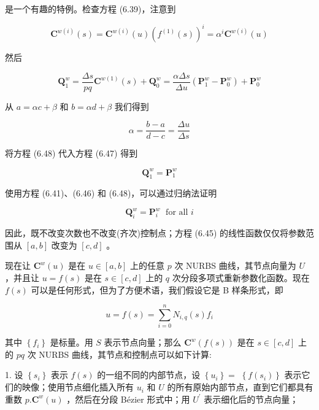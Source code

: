 \documentclass[../main.tex]{subfiles}
\begin{document}
是一个有趣的特例。检查方程 (6.39)，注意到

\[
{\mathbf{C}}^{w\left( i\right) }\left( s\right)  = {\mathbf{C}}^{w\left( i\right) }\left( u\right) {\left( {f}^{\left( 1\right) }\left( s\right) \right) }^{i} = {\alpha }^{i}{\mathbf{C}}^{w\left( i\right) }\left( u\right)  \tag{6.46}
\]

然后

\[
{\mathbf{Q}}_{1}^{w} = \frac{\Delta s}{pq}{\mathbf{C}}^{w\left( 1\right) }\left( s\right)  + {\mathbf{Q}}_{0}^{w} = \frac{\alpha \Delta s}{\Delta u}\left( {{\mathbf{P}}_{1}^{w} - {\mathbf{P}}_{0}^{w}}\right)  + {\mathbf{P}}_{0}^{w} \tag{6.47}
\]

从 \(a = {\alpha c} + \beta\) 和 \(b = {\alpha d} + \beta\) 我们得到

\[
\alpha  = \frac{b - a}{d - c} = \frac{\Delta u}{\Delta s} \tag{6.48}
\]

将方程 (6.48) 代入方程 (6.47) 得到

\[
{\mathbf{Q}}_{1}^{w} = {\mathbf{P}}_{1}^{w}
\]

使用方程 (6.41)、(6.46) 和 (6.48)，可以通过归纳法证明

\[
{\mathbf{Q}}_{i}^{w} = {\mathbf{P}}_{i}^{w}\;\text{ for all }i \tag{6.49}
\]

因此，既不改变次数也不改变(齐次)控制点；方程 (6.45) 的线性函数仅仅将参数范围从 \(\left\lbrack  {a,b}\right\rbrack\) 改变为 \(\left\lbrack  {c,d}\right\rbrack\) 。

现在让 \({\mathbf{C}}^{w}\left( u\right)\) 是在 \(u \in  \left\lbrack  {a,b}\right\rbrack\) 上的任意 \(p\) 次 NURBS 曲线，其节点向量为 \(U\) ，并且让 \(u = f\left( s\right)\) 是在 \(s \in  \left\lbrack  {c,d}\right\rbrack\) 上的 \(q\) 次分段多项式重新参数化函数。现在 \(f\left( s\right)\) 可以是任何形式，但为了方便术语，我们假设它是 B 样条形式，即

\[
u = f\left( s\right)  = \mathop{\sum }\limits_{{i = 0}}^{n}{N}_{i,q}\left( s\right) {f}_{i} \tag{6.50}
\]

其中 \(\left\{  {f}_{i}\right\}\) 是标量。用 \(S\) 表示节点向量；那么 \({\mathbf{C}}^{w}\left( {f\left( s\right) }\right)\) 是在 \(s \in  \left\lbrack  {c,d}\right\rbrack\) 上的 \({pq}\) 次 NURBS 曲线，其节点和控制点可以如下计算:

1. 设 \(\left\{  {s}_{i}\right\}\) 表示 \(f\left( s\right)\) 的一组不同的内部节点，设 \(\left\{  {u}_{i}\right\}   =\)  \(\left\{  {f\left( {s}_{i}\right) }\right\}\) 表示它们的映像；使用节点细化插入所有 \({u}_{i}\) 和 \(U\) 的所有原始内部节点，直到它们都具有重数 \(p.{\mathbf{C}}^{w}\left( u\right)\) ，然后在分段 Bézier 形式中；用 \({U}^{\prime }\) 表示细化后的节点向量；
\end{document}
